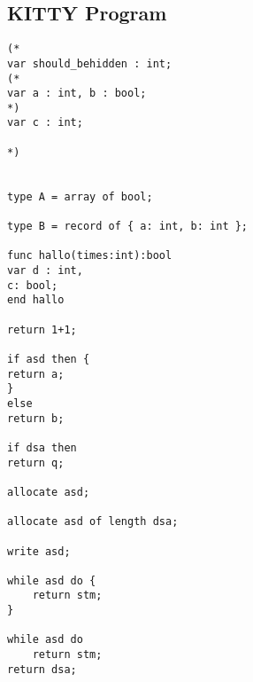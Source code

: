 \documentclass[a4paper]{article}
\begin{document}
\subsection{KITTY Program}
\begin{verbatim}
(*
var should_behidden : int;
(*
var a : int, b : bool;
*)
var c : int;

*)


type A = array of bool;

type B = record of { a: int, b: int };

func hallo(times:int):bool
var d : int,
c: bool;
end hallo

return 1+1;

if asd then {
return a;
}
else
return b;

if dsa then
return q;

allocate asd;

allocate asd of length dsa;

write asd;

while asd do {
    return stm;
}

while asd do
    return stm;
return dsa;
\end{verbatim}
\end{document}
